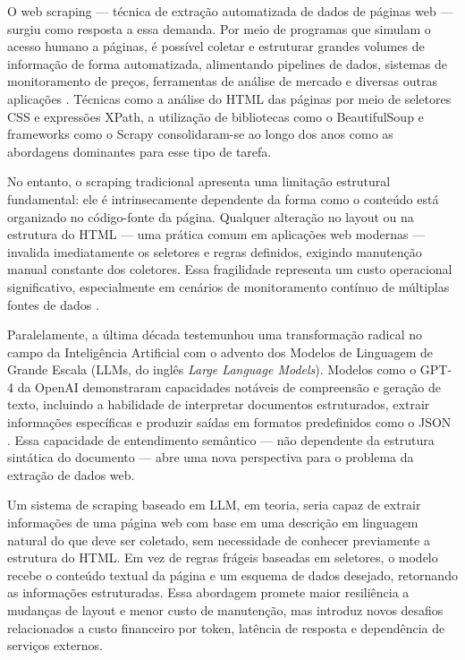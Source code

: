 \documentclass[tcc,capa]{texifsul}
\begin{document}
O web scraping — técnica de extração automatizada de dados de páginas web — surgiu como resposta a essa demanda. Por meio de programas que simulam o acesso humano a páginas, é possível coletar e estruturar grandes volumes de informação de forma automatizada, alimentando pipelines de dados, sistemas de monitoramento de preços, ferramentas de análise de mercado e diversas outras aplicações \cite{Mitchell2018}. Técnicas como a análise do HTML das páginas por meio de seletores CSS e expressões XPath, a utilização de bibliotecas como o BeautifulSoup e frameworks como o Scrapy consolidaram-se ao longo dos anos como as abordagens dominantes para esse tipo de tarefa.

No entanto, o scraping tradicional apresenta uma limitação estrutural fundamental: ele é intrinsecamente dependente da forma como o conteúdo está organizado no código-fonte da página. Qualquer alteração no layout ou na estrutura do HTML — uma prática comum em aplicações web modernas — invalida imediatamente os seletores e regras definidos, exigindo manutenção manual constante dos coletores. Essa fragilidade representa um custo operacional significativo, especialmente em cenários de monitoramento contínuo de múltiplas fontes de dados \cite{GlezPena2014}.

Paralelamente, a última década testemunhou uma transformação radical no campo da Inteligência Artificial com o advento dos Modelos de Linguagem de Grande Escala (LLMs, do inglês \textit{Large Language Models}). Modelos como o GPT-4 da OpenAI demonstraram capacidades notáveis de compreensão e geração de texto, incluindo a habilidade de interpretar documentos estruturados, extrair informações específicas e produzir saídas em formatos predefinidos como o JSON \cite{OpenAI2023}. Essa capacidade de entendimento semântico — não dependente da estrutura sintática do documento — abre uma nova perspectiva para o problema da extração de dados web.

Um sistema de scraping baseado em LLM, em teoria, seria capaz de extrair informações de uma página web com base em uma descrição em linguagem natural do que deve ser coletado, sem necessidade de conhecer previamente a estrutura do HTML. Em vez de regras frágeis baseadas em seletores, o modelo recebe o conteúdo textual da página e um esquema de dados desejado, retornando as informações estruturadas. Essa abordagem promete maior resiliência a mudanças de layout e menor custo de manutenção, mas introduz novos desafios relacionados a custo financeiro por token, latência de resposta e dependência de serviços externos.
\end{document}
